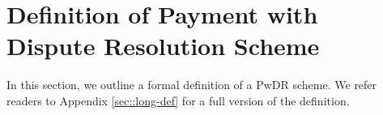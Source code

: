 




\vspace{-2mm}
\section{ Definition of Payment with Dispute Resolution Scheme}\label{sec::def}

In this section, we outline a formal definition of a  PwDR scheme. We refer readers to Appendix \ref{sec::long-def} for a full version of the  definition. 
%
%

